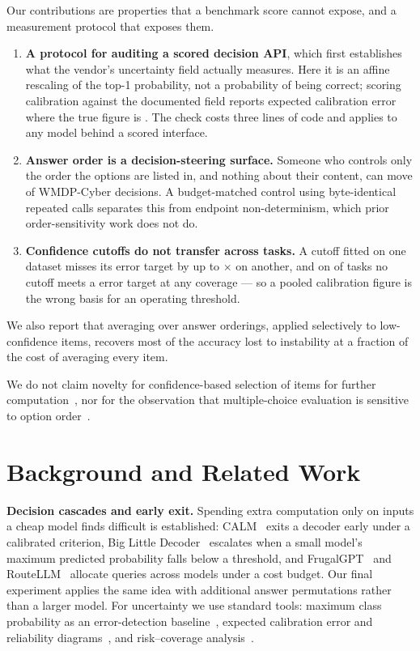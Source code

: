 \documentclass[conference,compsoc]{IEEEtran}
\begin{document}
\noindent Our contributions are properties that a benchmark score cannot expose, and a
measurement protocol that exposes them.
\begin{enumerate}
\item \textbf{A protocol for auditing a scored decision API}, which first establishes what
      the vendor's uncertainty field actually measures. Here it is an affine rescaling of
      the top-1 probability, not a probability of being correct; scoring calibration
      against the documented field reports \statEceConf{} expected calibration error where
      the true figure is \statEcePmax{}. The check costs three lines of code and applies to
      any model behind a scored interface.
\item \textbf{Answer order is a decision-steering surface.} Someone who controls only the
      order the options are listed in, and nothing about their content, can move
      \statAtkSteerRotCyber{} of WMDP-Cyber decisions. A budget-matched control using
      byte-identical repeated calls separates this from endpoint non-determinism, which
      prior order-sensitivity work does not do.
\item \textbf{Confidence cutoffs do not transfer across tasks.} A cutoff fitted on one
      dataset misses its error target by up to \statThrBioWorstRatio{}$\times$ on another,
      and on \statThrNUnachievable{} of \statThrNDatasets{} tasks no cutoff meets a
      \statThrTarget{} error target at any coverage --- so a pooled calibration figure is
      the wrong basis for an operating threshold.
\end{enumerate}
\noindent We also report that averaging over answer orderings, applied selectively to
low-confidence items, recovers most of the accuracy lost to instability at a fraction of
the cost of averaging every item.

We do not claim novelty for confidence-based selection of items for further
computation~\cite{calm,bild,frugalgpt,routellm}, nor for the observation that
multiple-choice evaluation is sensitive to option order~\cite{alzahrani,gupta}.

\section{Background and Related Work}

\textbf{Decision cascades and early exit.} Spending extra computation only on inputs a
cheap model finds difficult is established: CALM~\cite{calm} exits a decoder early under a
calibrated criterion, Big Little Decoder~\cite{bild} escalates when a small model's maximum
predicted probability falls below a threshold, and FrugalGPT~\cite{frugalgpt} and
RouteLLM~\cite{routellm} allocate queries across models under a cost budget. Our final
experiment applies the same idea with additional answer permutations rather than a larger
model. For uncertainty we use standard tools: maximum class probability as an
error-detection baseline~\cite{hendrycks}, expected calibration error and reliability
diagrams~\cite{guo}, and risk--coverage analysis~\cite{geifman}.
\end{document}
